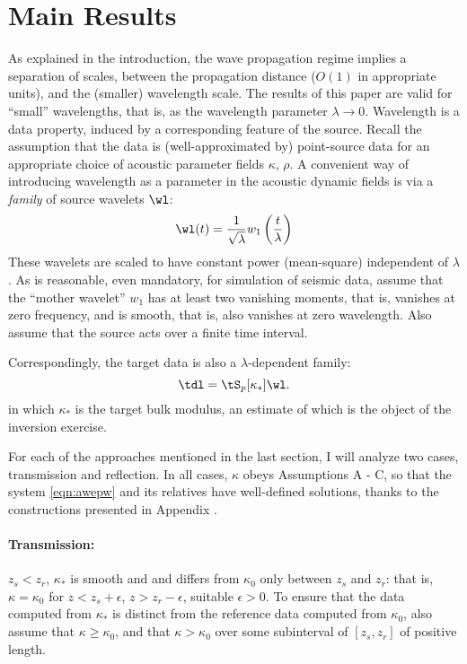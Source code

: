 \section{Main Results}

As explained in the introduction, the wave propagation regime implies
a separation of scales, between the propagation distance ($O(1)$ in
appropriate units), and the (smaller) wavelength scale. The results of
this paper are valid for ``small'' wavelengths, that is, as the
wavelength parameter $\lambda \rightarrow 0$. Wavelength is a data
property, induced by a corresponding feature of the source. Recall
the assumption that the data is (well-approximated by) point-source
data for an appropriate choice of acoustic parameter fields $\kappa$,
$\rho$. A convenient way of introducing wavelength as a parameter in
the acoustic dynamic fields is via a {\em family} of source wavelets $\wl$:
\[
\wl(t)=\frac{1}{\sqrt{\lambda}}w_1\left(\frac{t}{\lambda}\right)
\]
These wavelets are scaled to have constant power (mean-square)
independent of $\lambda$. As is reasonable, even mandatory, for simulation of seismic data, 
assume that the ``mother wavelet'' $w_1$ has at least two vanishing 
moments, that is, vanishes at zero frequency, and is smooth, that is,
also vanishes at zero wavelength. Also assume that the source acts
over a finite time interval.

Correspondingly, the target data is also a $\lambda$-dependent family:
\begin{equation}
  \label{eqn:datadef}
  \tdl = \tS_p[\kappa_*]\wl.
\end{equation}
in which $\kappa_*$ is the target bulk modulus, an estimate of which
is the object of the inversion exercise.

For each of the approaches mentioned in the last section, I will
analyze two cases, transmission and reflection. In all cases, $\kappa$
obeys Assumptions A - C, so that the system \ref{eqn:awepw} and its relatives have
well-defined solutions, thanks to the constructions presented in
Appendix \appSingular. 

\paragraph{Transmission:} $z_s < z_r$, $\kappa_*$ is smooth and and
differs from $\kappa_0$ only between $z_s$ and $z_r$: that is, $\kappa = \kappa_0$ for
$z < z_s+\epsilon$, $z>z_r-\epsilon$, suitable $\epsilon>0$. To ensure
that the data computed from $\kappa_*$ is distinct from the reference
data computed from $\kappa_0$, also assume that $\kappa \ge \kappa_0$,
and that $\kappa > \kappa_0$ over some subinterval of $[z_s,z_r]$ of
positive length.

